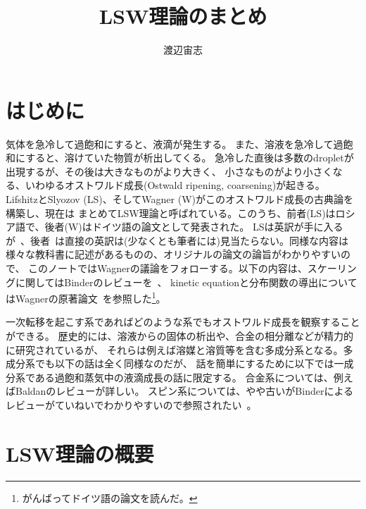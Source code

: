 \documentclass{jarticle}
\title{LSW理論のまとめ}
\author{渡辺宙志}
\affiliation{慶応義塾大学理工学部物理情報工学科}
\begin{document}
\maketitle

\section{はじめに}

気体を急冷して過飽和にすると、液滴が発生する。
また、溶液を急冷して過飽和にすると、溶けていた物質が析出してくる。
急冷した直後は多数のdropletが出現するが、その後は大きなものがより大きく、
小さなものがより小さくなる、いわゆるオストワルド成長(Ostwald ripening, coarsening)が起きる。
LifshitzとSlyozov (LS)、そしてWagner (W)がこのオストワルド成長の古典論を構築し、現在は
まとめてLSW理論と呼ばれている。このうち、前者(LS)はロシア語で、後者(W)はドイツ語の論文として発表された。
LSは英訳が手に入るが~\cite{LS1961}、後者~\cite{Wagner1961}は直接の英訳は(少なくとも筆者には)見当たらない。同様な内容は
様々な教科書に記述があるものの、オリジナルの論文の論旨がわかりやすいので、
このノートではWagnerの議論をフォローする。以下の内容は、スケーリングに関してはBinderのレビューを~\cite{Binder}、
kinetic equationと分布関数の導出についてはWagnerの原著論文~\cite{Wagner1961}を参照した\footnote{がんばってドイツ語の論文を読んだ。}。

一次転移を起こす系であればどのような系でもオストワルド成長を観察することができる。
歴史的には、溶液からの固体の析出や、合金の相分離などが精力的に研究されているが、
それらは例えば溶媒と溶質等を含む多成分系となる。多成分系でも以下の話は全く同様なのだが、
話を簡単にするために以下では一成分系である過飽和蒸気中の液滴成長の話に限定する。
合金系については、例えばBaldanのレビューが詳しい\cite{Baldan}。
スピン系については、やや古いがBinderによるレビューがていねいでわかりやすいので参照されたい~\cite{Binder}。

\section{LSW理論の概要}
\end{document}
